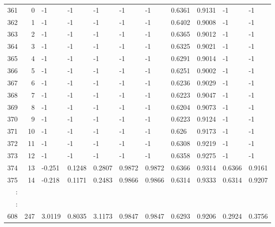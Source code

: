 \begin{table}[p]
{\begin{minipage}{\textheight}
\begin{tabular}{rr|lll|ll|llll}
361   	& 0   			& -1    	& -1     	& -1    			& -1    	& -1    	& 0.6361	& 0.9131		& -1    			& -1    				\\
362   	& 1   			& -1    	& -1     	& -1    			& -1    	& -1    	& 0.6402	& 0.9008		& -1    			& -1    				\\
363   	& 2   			& -1    	& -1     	& -1    			& -1    	& -1    	& 0.6365	& 0.9012		& -1    			& -1    				\\
364   	& 3   			& -1    	& -1     	& -1    			& -1    	& -1    	& 0.6325	& 0.9021		& -1    			& -1    				\\
365   	& 4   			& -1    	& -1     	& -1    			& -1    	& -1    	& 0.6291	& 0.9014		& -1    			& -1    				\\
366   	& 5   			& -1    	& -1     	& -1    			& -1    	& -1    	& 0.6251	& 0.9002		& -1    			& -1    				\\
367   	& 6   			& -1    	& -1     	& -1    			& -1    	& -1    	& 0.6236	& 0.9029		& -1    			& -1    				\\
368   	& 7   			& -1    	& -1     	& -1    			& -1    	& -1    	& 0.6223	& 0.9047		& -1    			& -1    				\\
369   	& 8   			& -1    	& -1     	& -1    			& -1    	& -1    	& 0.6204	& 0.9073		& -1    			& -1    				\\
370   	& 9   			& -1    	& -1     	& -1    			& -1    	& -1    	& 0.6223	& 0.9124		& -1    			& -1    				\\
371   	& 10  			& -1    	& -1     	& -1    			& -1    	& -1    	& 0.626 	& 0.9173		& -1    			& -1    				\\
372   	& 11  			& -1    	& -1     	& -1    			& -1    	& -1    	& 0.6308	& 0.9219		& -1    			& -1    				\\
373   	& 12  			& -1    	& -1     	& -1    			& -1    	& -1    	& 0.6358	& 0.9275		& -1    			& -1    				\\
374   	& 13  			& -0.251	& 0.1248 	& 0.2807			& 0.9872	& 0.9872	& 0.6366	& 0.9314		& 0.6366			& 0.9161				\\
375   	& 14  			& -0.218	& 0.1171 	& 0.2483			& 0.9866	& 0.9866	& 0.6314	& 0.9333		& 0.6314			& 0.9207				\\
:     	&     			&       	&        	&       			&       	&       	&       	&       		&       			&       				\\
\hline
:     	&     			&       	&        	&       			&       	&       	&       	&       		&       			&       				\\
608   	& 247 			& 3.0119	& 0.8035 	& 3.1173			& 0.9847	& 0.9847	& 0.6293	& 0.9206		& 0.2924			& 0.3756				\\

\end{tabular}
\end{minipage}}
\end{table}
